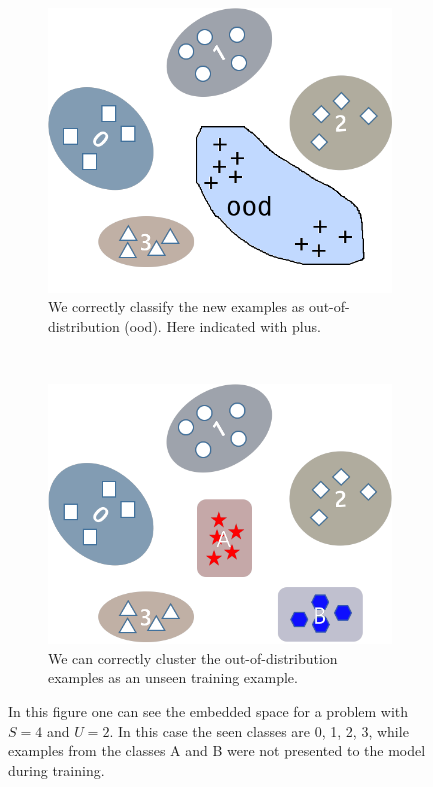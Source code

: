 \begin{figure}
	\centering
	\begin{subfigure}[h]{0.5\textwidth}
		\centering
		\includegraphics[width=0.9\linewidth]{../figures/detection_of_unseen_classes_unclassified}
		\caption{We correctly classify the new examples as out-of-distribution (ood). Here indicated with plus.}
		\label{fig:detectionofunseenclassesunclassified}
	\end{subfigure}%
	~ 
	\begin{subfigure}[h]{0.5\textwidth}
		\centering
		\includegraphics[width=0.9\linewidth]{../figures/detection_of_unseen_classes_classified}
		\caption{We can correctly cluster the out-of-distribution examples as an unseen training example.}
		\label{fig:detectionofunseenclassesclassified}
	\end{subfigure}
	\caption{In this figure one can see the embedded space for a problem with $S=4$ and $U=2$. In this case the seen classes are 0, 1, 2, 3, while examples from the classes A and B were not presented to the model during training.}
	\label{fig:detectionofunseenclasses}
\end{figure}

